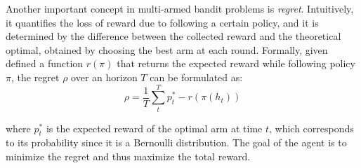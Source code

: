 Another important concept in multi-armed bandit problems is \textit{regret}. Intuitively, it quantifies the loss of reward due to following a certain policy, and it is determined by the difference between the collected reward and the theoretical optimal, obtained by choosing the best arm at each round.
Formally, given defined a function $r(\pi)$ that returns the expected reward while following policy $\pi$, the regret $\rho$ over an horizon $T$ can be formulated as:
\begin{equation}
    \rho = \frac{1}{T}\sum^{T}_{t} p^{*}_{t} -r(\pi(h_{t}))
\end{equation}

\noindent where $p^{*}_{t}$ is the expected reward of the optimal arm at time $t$, which corresponds to its probability since it is a Bernoulli distribution.
\noindent The goal of the agent is to minimize the regret and thus maximize the total reward.








